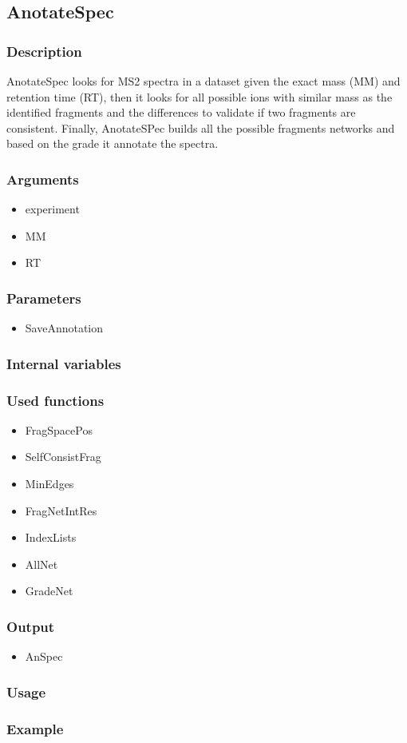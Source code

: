 \subsection{AnotateSpec}
\subsubsection{Description}
AnotateSpec looks for MS2 spectra in a dataset given the exact mass (MM) and retention time (RT), then it looks for all possible ions with similar mass as the identified fragments and the differences to validate if two fragments are consistent. Finally, AnotateSPec builds all the possible fragments networks and based on the grade it annotate the spectra.
\subsubsection{Arguments}
\begin{itemize}
\item experiment
\item MM
\item RT
\end{itemize}
\subsubsection{Parameters}
\begin{itemize}
\item SaveAnnotation
\end{itemize}
\subsubsection{Internal variables}
\subsubsection{Used functions}
\begin{itemize}
\item FragSpacePos
\item SelfConsistFrag
\item MinEdges
\item FragNetIntRes
\item IndexLists
\item AllNet
\item GradeNet
\end{itemize}
\subsubsection{Output}
\begin{itemize}
\item AnSpec
\end{itemize}
\subsubsection{Usage}
\subsubsection{Example}
